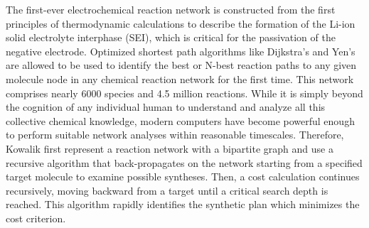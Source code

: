 \documentclass[%
 aip,
 jmp,%
 amsmath,amssymb,
 reprint,%
]{revtex4-2}
\begin{document}
The first-ever electrochemical reaction network is constructed from the first principles of thermodynamic calculations 
to describe the formation of the Li-ion solid electrolyte interphase (SEI), which is critical for the 
passivation of the negative electrode. Optimized shortest path algorithms like Dijkstra's and Yen's 
are allowed to be used to identify the best or N-best reaction paths to any given molecule node in
any chemical reaction network for the first time. This network comprises nearly 6000 species and 4.5 million reactions\cite{blau2021chemically}.
While it is simply beyond the cognition of any individual human to understand and analyze all this
collective chemical knowledge, modern computers have become powerful enough to perform suitable network
analyses within reasonable timescales. Therefore, Kowalik first represent a reaction network with a bipartite graph
and use a recursive algorithm that back-propagates on the network starting from a specified target molecule 
to examine possible syntheses. Then, a cost calculation continues recursively, moving backward from a target until a critical 
search depth is reached. This algorithm rapidly identifies the synthetic plan which minimizes the cost
criterion\cite{kowalik2012parallel}.
\end{document}
